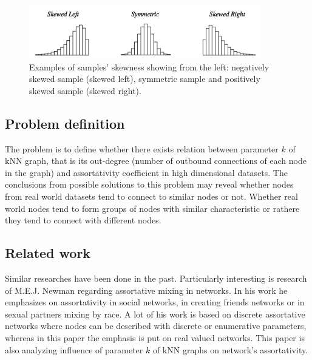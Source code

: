 \begin{figure}[h!]
  \centering
  \captionsetup{width=26pc, justification=centering}
    \includegraphics[width=0.9\textwidth]{images/skewness.png}
  \caption{Examples of samples' skewness showing from the left: negatively skewed sample (skewed left), symmetric sample and positively skewed sample (skewed right).}
  \label{fig:skewness}
\end{figure}

\subsection{Problem definition}
The problem is to define whether there exists relation between parameter $k$ of kNN graph, that is its out-degree (number of outbound connections of each node in the graph) and assortativity coefficient in high dimensional datasets.
The conclusions from possible solutions to this problem may reveal whether nodes from real world datasets tend to connect to similar nodes or not.
Whether real world nodes tend to form groups of nodes with similar characteristic or rathere they tend to connect with different nodes.

\subsection{Related work}
Similar researches have been done in the past.
Particularly interesting is research of M.E.J. Newman\cite{newman_mixing_patterns_in_networks} regarding assortative mixing in networks.
In his work he emphasizes on assortativity in social networks, in creating friends networks or in sexual partners mixing by race.
A lot of his work is based on discrete assortative networks where nodes can be described with discrete or enumerative parameters, whereas in this paper the emphasis is put on real valued networks.
This paper is also analyzing influence of parameter $k$ of kNN graphs on network's assortativity.